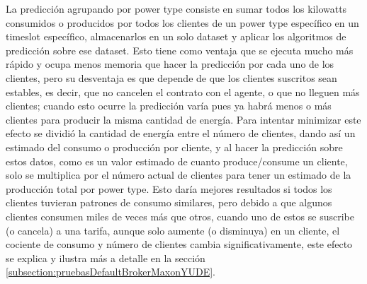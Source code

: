 La predicción agrupando por power type consiste en sumar todos los kilowatts consumidos o producidos por todos los clientes de un power type específico en un timeslot específico, almacenarlos en un solo dataset y aplicar los algoritmos de predicción sobre ese dataset. 
Esto tiene como ventaja que se ejecuta mucho más rápido y ocupa menos memoria que hacer la predicción por cada uno de los clientes, pero su desventaja es que depende de que los clientes suscritos sean estables, es decir, que no cancelen el contrato con el agente, o que no lleguen más clientes; cuando esto ocurre la predicción varía pues ya habrá menos o más clientes para producir la misma cantidad de energía. 
Para  intentar minimizar este efecto se dividió la cantidad de energía entre el número de clientes, dando así un estimado del consumo o producción por cliente, y al hacer la predicción sobre estos datos, como es un valor estimado de cuanto produce/consume un cliente, solo se multiplica por el número actual de clientes para tener un estimado de la producción total por power type. 
Esto daría mejores resultados si todos los clientes tuvieran patrones de consumo similares, pero debido a que algunos clientes consumen miles de veces más que otros, cuando uno de estos se suscribe (o cancela) a una tarifa, aunque solo aumente (o disminuya) en un cliente, el cociente de consumo y número de clientes cambia significativamente, este efecto se explica y ilustra más a detalle en la sección \ref{subsection:pruebasDefaultBrokerMaxonYUDE}.

